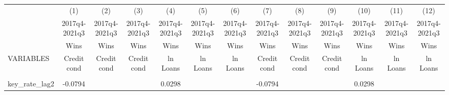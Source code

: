 \documentclass[]{article}
\begin{document}
\begin{center}
\begin{tabular}{lcccccccccccc} \hline
 & (1) & (2) & (3) & (4) & (5) & (6) & (7) & (8) & (9) & (10) & (11) & (12) \\
 & 2017q4-2021q3 & 2017q4-2021q3 & 2017q4-2021q3 & 2017q4-2021q3 & 2017q4-2021q3 & 2017q4-2021q3 & 2017q4-2021q3 & 2017q4-2021q3 & 2017q4-2021q3 & 2017q4-2021q3 & 2017q4-2021q3 & 2017q4-2021q3 \\
 & Wins & Wins & Wins & Wins & Wins & Wins & Wins & Wins & Wins & Wins & Wins & Wins \\
VARIABLES & Credit cond & Credit cond & Credit cond & ln Loans & ln Loans & ln Loans & Credit cond & Credit cond & Credit cond & ln Loans & ln Loans & ln Loans \\ \hline
\vspace{4pt} & \begin{footnotesize}\end{footnotesize} & \begin{footnotesize}\end{footnotesize} & \begin{footnotesize}\end{footnotesize} & \begin{footnotesize}\end{footnotesize} & \begin{footnotesize}\end{footnotesize} & \begin{footnotesize}\end{footnotesize} & \begin{footnotesize}\end{footnotesize} & \begin{footnotesize}\end{footnotesize} & \begin{footnotesize}\end{footnotesize} & \begin{footnotesize}\end{footnotesize} & \begin{footnotesize}\end{footnotesize} & \begin{footnotesize}\end{footnotesize} \\
key\_rate\_lag2 & -0.0794 &  &  & 0.0298 &  &  & -0.0794 &  &  & 0.0298 &  &  \\

\end{tabular}
\end{center}
\end{document}

